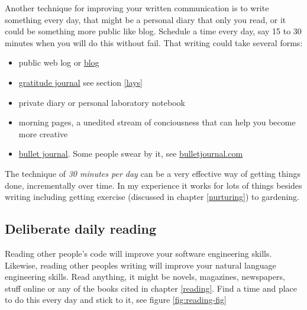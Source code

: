 \documentclass[
]{book}
\providecommand{\tightlist}{%
  \setlength{\itemsep}{0pt}\setlength{\parskip}{0pt}}
\begin{document}
Another technique for improving your written communication is to write something every day, that might be a personal diary that only you read, or it could be something more public like blog. Schedule a time every day, say 15 to 30 minutes when you will do this without fail. That writing could take several forms:

\begin{itemize}
\tightlist
\item
  public web log or \href{https://en.wikipedia.org/wiki/Blog}{blog}
\item
  \href{https://en.wikipedia.org/wiki/Gratitude_journal}{gratitude journal} see section \ref{lays}
\item
  private diary or personal laboratory notebook
\item
  morning pages, a unedited stream of conciousness that can help you become more creative \citep{cameron, burkeman}
\item
  \href{https://en.wikipedia.org/wiki/Bullet_journal}{bullet journal}. Some people swear by it, see \href{https://bulletjournal.com/}{bulletjournal.com}
\end{itemize}

The technique of \emph{30 minutes per day} can be a very effective way of getting things done, incrementally over time. In my experience it works for lots of things besides writing including getting exercise (discussed in chapter \ref{nurturing}) to gardening. \citep{leendertz}

\hypertarget{dailyread}{%
\subsection{Deliberate daily reading}\label{dailyread}}

Reading other people's code will improve your software engineering skills. Likewise, reading other peoples writing will improve your natural language engineering skills. Read anything, it might be novels, magazines, newspapers, stuff online or any of the books cited in chapter \ref{reading}. Find a time and place to do this every day and stick to it, see figure \ref{fig:reading-fig}
\end{document}

